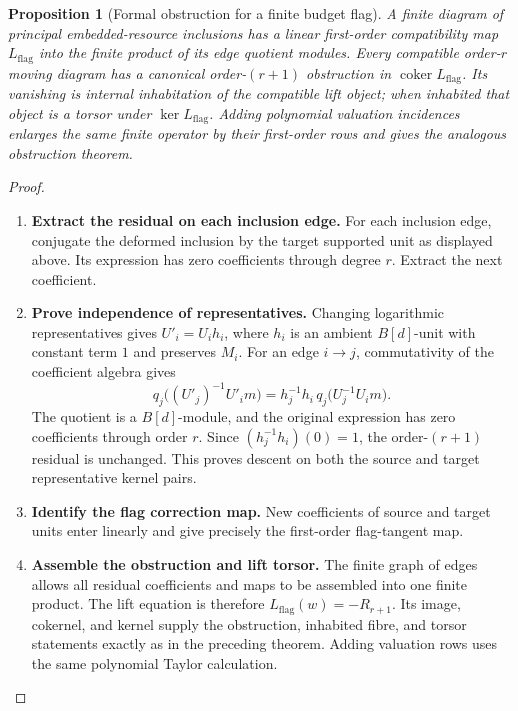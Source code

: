 \documentclass[11pt,a4paper]{article}
\numberwithin{algorithm}{section}
\numberwithin{equation}{section}
\newtheorem{proposition}[proposition]{Proposition}
\theoremstyle{definition}
\theoremstyle{remark}
\theoremstyle{plain}
\theoremstyle{definition}
\theoremstyle{plain}
\begin{document}
\begin{proposition}[Formal obstruction for a finite budget flag]
\label{prop:formal-flag-obstruction}
A finite diagram of principal embedded-resource inclusions has
a linear first-order compatibility map
$L_{\mathrm{flag}}$ into the finite product of its edge quotient
modules.  Every compatible order-$r$ moving diagram has a
canonical order-$(r+1)$ obstruction in
$\operatorname{coker}L_{\mathrm{flag}}$.  Its vanishing is
internal inhabitation of the compatible lift object; when
inhabited that object is a torsor under
$\ker L_{\mathrm{flag}}$.  Adding polynomial valuation
incidences enlarges the same finite operator by their first-order
rows and gives the analogous obstruction theorem.
\end{proposition}
\begin{proof}\leavevmode
\begin{enumerate}[leftmargin=*,align=left]
\item \textbf{Extract the residual on each inclusion edge.}
For each inclusion edge, conjugate the deformed inclusion by
the target supported unit as displayed above.  Its expression
has zero coefficients through degree $r$.  Extract the next
coefficient.

\item \textbf{Prove independence of representatives.}
Changing logarithmic representatives gives $U'_i=U_i h_i$,
where $h_i$ is an ambient $B[d]$-unit with constant term $1$
and preserves $M_i$. For an edge $i\to j$, commutativity
of the coefficient algebra gives
\[
 q_j\bigl((U'_j)^{-1}U'_i m\bigr)
   =h_j^{-1}h_i\,
      q_j\bigl(U_j^{-1}U_i m\bigr).
\]
The quotient is a $B[d]$-module, and the original expression
has zero coefficients through order $r$.
Since $(h_j^{-1}h_i)(0)=1$, the order-$(r+1)$ residual
is unchanged. This proves descent on both the source and
target representative kernel pairs.

\item \textbf{Identify the flag correction map.}
New coefficients of
source and target units enter linearly and give precisely the
first-order flag-tangent map.

\item \textbf{Assemble the obstruction and lift torsor.}
The finite graph of edges allows
all residual coefficients and maps to be assembled into one
finite product.  The lift equation is therefore
$L_{\mathrm{flag}}(w)=-R_{r+1}$.  Its image, cokernel, and
kernel supply the obstruction, inhabited fibre, and torsor
statements exactly as in the preceding theorem.  Adding
valuation rows uses the same polynomial Taylor calculation.
\end{enumerate}
\end{proof}
\end{document}
